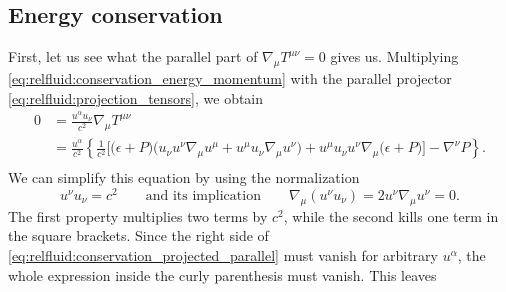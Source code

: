 \subsection{Energy conservation}

First, let us see what the parallel part of $\nabla_\mu T^{\mu \nu} = 0$ gives us.
Multiplying \cref{eq:relfluid:conservation_energy_momentum} with the parallel projector \eqref{eq:relfluid:projection_tensors}, we obtain
\begin{equation}
\begin{split}
	0 &= \frac{u^\alpha u_\nu}{c^2} \nabla_\mu T^{\mu \nu} \\
	  &= \frac{u^\alpha}{c^2} \left\{ \frac{1}{c^2} \bigg[ \Big( \epsilon + P \Big) \Big( u_\nu u^\nu \nabla_\mu u^\mu + u^\mu u_\nu \nabla_\mu u^\nu \Big) + u^\mu u_\nu u^\nu \nabla_\mu \Big( \epsilon + P \Big) \bigg] - \nabla^\nu P \right\} . \\
\end{split}
\label{eq:relfluid:conservation_projected_parallel}
\end{equation}
We can simplify this equation by using the normalization
\begin{equation}
	u^\nu u_\nu = c^2 
	\qquad \text{and its implication} \qquad
	\nabla_\mu \left( u^\nu u_\nu \right) = 2 u^\nu \nabla_\mu u^\nu = 0 .
\label{eq:relfluid:tricks}
\end{equation}
The first property multiplies two terms by $c^2$, while the second kills one term in the square brackets.
Since the right side of \cref{eq:relfluid:conservation_projected_parallel} must vanish for arbitrary $u^\alpha$, the whole expression inside the curly parenthesis must vanish.
This leaves
